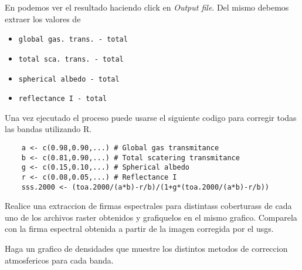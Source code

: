 En  podemos ver el resultado haciendo click en \emph{Output
file}. Del mismo debemos extraer los valores de
 \begin{itemize}
     \item \texttt{global gas. trans. - total}
     \item \texttt{total sca. trans. - total}
     \item \texttt{spherical albedo - total}
     \item \texttt{reflectance I - total}
 \end{itemize}

Una vez ejecutado el proceso puede usarse el siguiente codigo para corregir
todas las bandas utilizando R.

\begin{lstlisting}
    a <- c(0.98,0.90,...) # Global gas transmitance
    b <- c(0.81,0.90,...) # Total scatering transmitance
    g <- c(0.15,0.10,...) # Spherical albedo
    r <- c(0.08,0.05,...) # Reflectance I
    sss.2000 <- (toa.2000/(a*b)-r/b)/(1+g*(toa.2000/(a*b)-r/b))
\end{lstlisting}


\begin{act}
    Realice una extraccion de firmas espectrales para distintass coberturass de
    cada uno de los archivos raster obtenidos y grafiquelos en el mismo grafico.
    Comparela con la firma espectral obtenida a partir de la imagen corregida
    por el usgs.
\end{act}

\begin{act}
    Haga un grafico de densidades que muestre los distintos metodos de
    correccion atmosfericos para cada banda.
\end{act}
